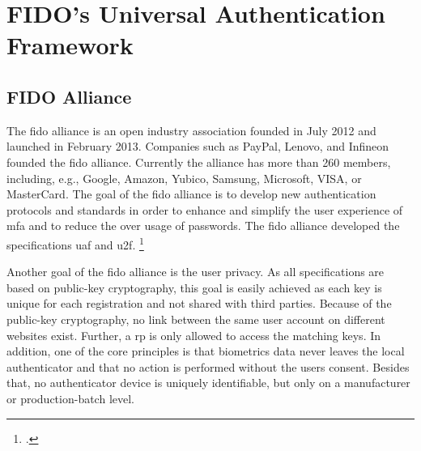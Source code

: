 \section{FIDO's Universal Authentication Framework}
\subsection{FIDO Alliance}
\label{subsec:fido_alliance}

The \gls{fido} alliance is an open industry association founded in July 2012 and launched in February 2013. Companies such as PayPal, Lenovo, and Infineon founded the \gls{fido} alliance. Currently the alliance has more than 260 members, including, e.g., Google, Amazon, Yubico, Samsung, Microsoft, VISA, or MasterCard. The goal of the \gls{fido} alliance is to develop new authentication protocols and standards in order to enhance and simplify the user experience of \gls{mfa} and to reduce the over usage of passwords. The \gls{fido} alliance developed the specifications \gls{uaf} and \gls{u2f}. \footcites[See][583]{eckert-it-sec-9}[See][17]{fido-ct-2}

Another goal of the \gls{fido} alliance is the user privacy. As all specifications are based on public-key cryptography, this goal is easily achieved as each key is unique for each registration and not shared with third parties. Because of the public-key cryptography, no link between the same user account on different websites exist. Further, a \gls{rp} is only allowed to access the matching keys. In addition, one of the core principles is that biometrics data never leaves the local authenticator and that no action is performed without the users consent. Besides that, no authenticator device is uniquely identifiable, but only on a manufacturer or production-batch level.


